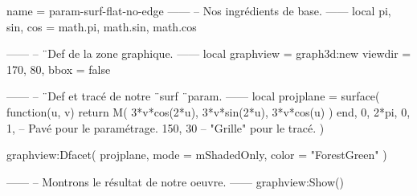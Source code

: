 \documentclass[border = 3pt]{standalone}
\begin{document}
\begin{luadraw}{name = param-surf-flat-no-edge}
------
-- Nos ingrédients de base.
------
local pi, sin, cos = math.pi, math.sin, math.cos

------
-- ¨Def de la zone graphique.
------
local graphview = graph3d:new{
  viewdir = {170, 80},
  bbox     = false
}

------
-- ¨Def et tracé de notre ¨surf ¨param.
------
local projplane = surface(
  function(u, v)
    return M(
      3*v*cos(2*u),
      3*v*sin(2*u),
      3*v*cos(u)
    )
  end,
  0, 2*pi, 0, 1,  -- Pavé pour le paramétrage.
  {150, 30}       -- "Grille" pour le tracé.
)

graphview:Dfacet(
  projplane,
  {
    mode  = mShadedOnly,
    color = "ForestGreen"
  }
)

------
-- Montrons le résultat de notre oeuvre.
------
graphview:Show()
\end{luadraw}
\end{document}
